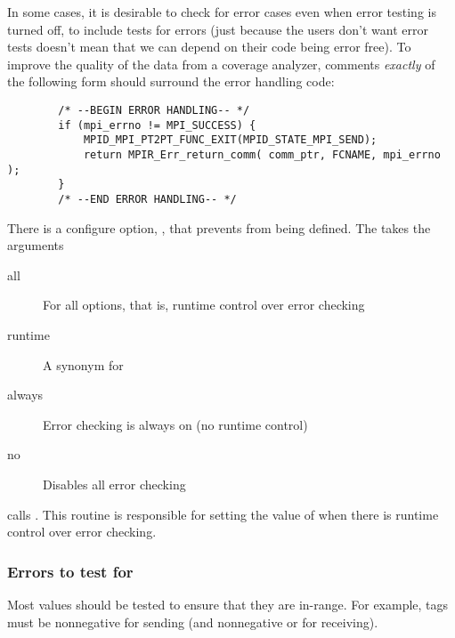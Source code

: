 \documentclass{article}
\begin{document}
In some cases, it is desirable to check for error cases even when
error testing is turned off, to include tests for errors (just because
the users don't want error tests doesn't mean that we can depend on
their code being error free).  To improve the quality of the data from
a coverage analyzer, comments \emph{exactly} of the following form
should surround the error handling code:
\begin{verbatim}
        /* --BEGIN ERROR HANDLING-- */
        if (mpi_errno != MPI_SUCCESS) {
            MPID_MPI_PT2PT_FUNC_EXIT(MPID_STATE_MPI_SEND);
            return MPIR_Err_return_comm( comm_ptr, FCNAME, mpi_errno );
        }     
        /* --END ERROR HANDLING-- */
\end{verbatim}


There is a configure option,
,  
that prevents  from being defined.  The
takes the arguments
\begin{description}
\item[all]For all options, that is, runtime control over error checking
\item[runtime]A synonym for 
\item[always]Error checking is always on (no runtime control)
\item[no]Disables all error checking
\end{description}

 calls .  This
routine is responsible for setting the value of
 when there is runtime control over
error checking.


\subsubsection{Errors to test for}
Most values should be tested to ensure that they are in-range.  For example,
tags must be nonnegative for sending (and nonnegative or
 for receiving). 
\end{document}
